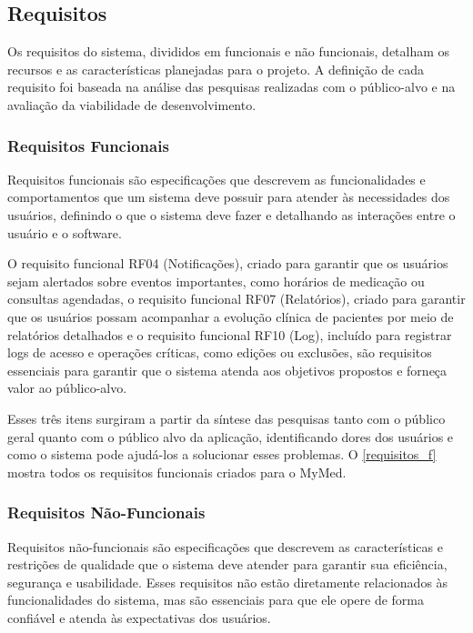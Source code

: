 \documentclass[
	article,			%
	12pt,				%
	oneside,			%
	a4paper,			%
    BIBLATEX,           %
	english,			%
	brazil,				%
	sumario=tradicional
	]{abntex2}
\newcommand\nomeprojeto{MyMed}
\begin{document}
\subsection{Requisitos}

Os requisitos do sistema, divididos em funcionais e não funcionais, detalham os recursos e as características planejadas para o projeto. A definição de cada requisito foi baseada na análise das pesquisas realizadas com o público-alvo e na avaliação da viabilidade de desenvolvimento.

\subsubsection{Requisitos Funcionais}

Requisitos funcionais são especificações que descrevem as funcionalidades e comportamentos que um sistema deve possuir para atender às necessidades dos usuários, definindo o que o sistema deve fazer e detalhando as interações entre o usuário e o software.

O requisito funcional RF04 (Notificações), criado para garantir que os usuários sejam alertados sobre eventos importantes, como horários de medicação ou consultas agendadas, o requisito funcional RF07 (Relatórios), criado para garantir que os usuários possam acompanhar a evolução clínica de pacientes por meio de relatórios detalhados e o requisito funcional RF10 (Log), incluído para registrar logs de acesso e operações críticas, como edições ou exclusões, são requisitos essenciais para garantir que o sistema atenda aos objetivos propostos e forneça valor ao público-alvo. 

Esses três itens surgiram a partir da síntese das pesquisas tanto com o público geral quanto com o público alvo da aplicação, identificando dores dos usuários e como o sistema pode ajudá-los a solucionar esses problemas. O \autoref{requisitos_f} mostra todos os requisitos funcionais criados para o \nomeprojeto.

\subsubsection{Requisitos Não-Funcionais}

Requisitos não-funcionais são especificações que descrevem as características e restrições de qualidade que o sistema deve atender para garantir sua eficiência, segurança e usabilidade. Esses requisitos não estão diretamente relacionados às funcionalidades do sistema, mas são essenciais para que ele opere de forma confiável e atenda às expectativas dos usuários.
\end{document}
